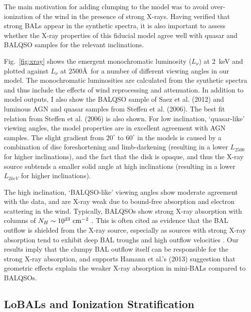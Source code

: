 The main motivation for adding clumping to the model was
to avoid over-ionization of the wind in the presence of strong X-rays. 
Having verified that strong BALs appear in the synthetic spectra,
it is also important to assess whether the X-ray properties of this
fiducial model agree well with quasar and BALQSO samples for the relevant
inclinations.

Fig.~\ref{fig:xray} shows the emergent
monochromatic luminosity ($L_\nu$) at 2~keV and 
plotted against $L_\nu$ at $2500$\AA\ for a number of different viewing angles in our model.
The monochromatic luminosities are calculated from the synthetic spectra and thus include
the effects of wind reprocessing and attenuation. In addition to model outputs,
I also show the BALQSO sample of Saez et al. (2012) and luminous AGN and quasar
samples from Steffen et al. (2006). The best fit relation from Steffen et al. (2006) 
is also shown. For low inclination, `quasar-like' viewing angles,
the model properties are in excellent agreement with AGN samples. The slight gradient from $20^\circ$ to
$60^\circ$ in the models is caused by a combination of disc foreshortening and limb-darkening 
(resulting in a lower $L_{2500}$ for higher inclinations), and the fact that the disk 
is opaque, and thus the X-ray source subtends a smaller solid angle at high inclinations
(resulting in a lower $L_{2keV}$ for higher inclinations). 


The high inclination, `BALQSO-like' viewing angles show moderate agreement with the data,
and are X-ray weak due to bound-free absorption and electron scattering in the wind.
Typically, BALQSOs show strong X-ray absorption with columns 
of $N_H\sim10^{23}~\rm{cm^{-2}}$ 
\citep{green1996,mathur2000,green2001,grupemathur2003}.
This is often cited as evidence that the BAL outflow is shielded from
the X-ray source, especially as sources with strong X-ray absorption tend
to exhibit deep BAL troughs and high outflow velocities 
\citep{brandt2000,laorbrandt2002,gallagher2006}.
Our results imply that the clumpy BAL outflow
itself can be responsible for the strong X-ray absorption, 
and supports Hamann et al.'s (2013) suggestion that 
geometric effects explain the weaker X-ray absorption in mini-BALs 
compared to BALQSOs.

\subsection{LoBALs and Ionization Stratification}

